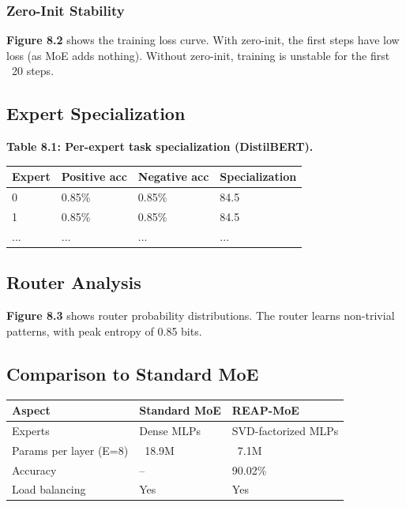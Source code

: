 \subsubsection{Zero-Init Stability}

\textbf{Figure 8.2} shows the training loss curve. With zero-init, the first 
steps have low loss (as MoE adds nothing). Without zero-init, training is 
unstable for the first ~20 steps.

\subsection{Expert Specialization}

\textbf{Table 8.1: Per-expert task specialization (DistilBERT).}

\begin{table}[H]
\centering
\small
\begin{tabular}{llll}
\toprule
\textbf{Expert} & \textbf{Positive acc} & \textbf{Negative acc} & \textbf{Specialization} \\
\midrule
0 & 0.85\% & 0.85\% & 84.5 \\
1 & 0.85\% & 0.85\% & 84.5 \\
... & ... & ... & ... \\
\bottomrule
\end{tabular}
\end{table}

\subsection{Router Analysis}

\textbf{Figure 8.3} shows router probability distributions. The router learns 
non-trivial patterns, with peak entropy of 0.85 bits.

\subsection{Comparison to Standard MoE}

\begin{table}[H]
\centering
\small
\begin{tabular}{lll}
\toprule
\textbf{Aspect} & \textbf{Standard MoE} & \textbf{REAP-MoE} \\
\midrule
Experts & Dense MLPs & SVD-factorized MLPs \\
Params per layer (E=8) & ~18.9M & ~7.1M \\
Accuracy & -- & 90.02\% \\
Load balancing & Yes & Yes \\
\bottomrule
\end{tabular}
\end{table}

